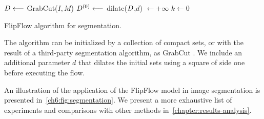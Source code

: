 \begin{algorithm}[]
 
 \BlankLine

 $D \longleftarrow$ GrabCut($I,M$)\;
 $D^{(0)} \longleftarrow $ dilate($D$,$d$)\; 
 \Delta $\longleftarrow +\infty$\;
 $k \longleftarrow 0$\;
 \caption{FlipFlow algorithm for segmentation.}
  \label{ch6:alg:contour-correction} 
\end{algorithm}	

The algorithm can be initialized by a collection of compact sets, or with the result of a third-party segmentation algorithm, as GrabCut \cite{rother04grabcut}. We include an additional parameter $d$ that dilates the initial sets using a square of side one before executing the flow.

An illustration of the application of the FlipFlow model in image segmentation is presented in~\cref{ch6:fig:segmentation}. We present a more exhaustive list of experiments and comparisons with other methods in~\cref{chapter:results-analysis}.


